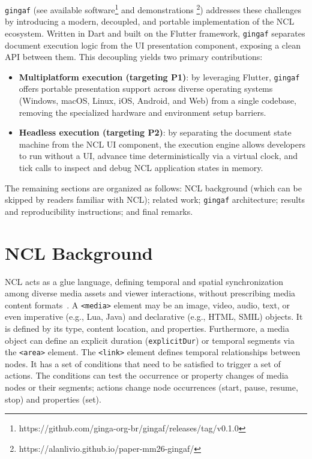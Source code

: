 \documentclass[sigconf,authorversion,review,authordraft]{acmart}
\newcommand{\projectname}{\texttt{gingaf}}
\begin{document}
\projectname{} (see available software\footnote{https://github.com/ginga-org-br/gingaf/releases/tag/v0.1.0} and demonstrations \footnote{https://alanlivio.github.io/paper-mm26-gingaf/}) addresses these challenges by introducing a modern, decoupled, and portable implementation of the NCL ecosystem. Written in Dart and built on the Flutter framework, \projectname{} separates document execution logic from the UI presentation component, exposing a clean API between them. This decoupling yields two primary contributions:
\begin{itemize}
  \item \textbf{Multiplatform execution (targeting P1)}: by leveraging Flutter, \projectname{} offers portable presentation support across diverse operating systems (Windows, macOS, Linux, iOS, Android, and Web) from a single codebase, removing the specialized hardware and environment setup barriers.
  \item \textbf{Headless execution (targeting P2)}: by separating the document state machine from the NCL UI component, the execution engine allows developers to run without a UI, advance time deterministically via a virtual clock, and tick calls to inspect and debug NCL application states in memory.
\end{itemize}

The remaining sections are organized as follows: NCL background (which can be skipped by readers familiar with NCL); related work; \projectname{} architecture; results and reproducibility instructions; and final remarks.

\section{NCL Background}
\label{sec:background}

NCL acts as a glue language, defining temporal and spatial synchronization among diverse media assets and viewer interactions, without prescribing media content formats~\cite{soares_nested_2006_model}. A \texttt{<media>} element may be an image, video, audio, text, or even imperative (e.g., Lua, Java) and declarative (e.g., HTML, SMIL) objects. It is defined by its type, content location, and properties. Furthermore, a media object can define an explicit duration (\texttt{explicitDur}) or temporal segments via the \texttt{<area>} element. The \texttt{<link>} element defines temporal relationships between nodes. It has a set of conditions that need to be satisfied to trigger a set of actions. The conditions can test the occurrence or property changes of media nodes or their segments; actions change node occurrences (start, pause, resume, stop) and properties (set).
\end{document}
